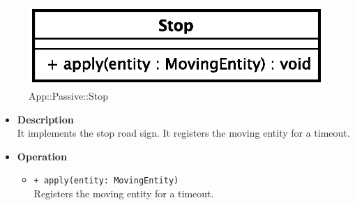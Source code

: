 \begin{figure}[h]
\centering
\includegraphics[scale=0.6,keepaspectratio]{images/solution/stop.eps}
\caption{App::Passive::Stop}
\label{fig:sd-app-stop}
\end{figure}
\FloatBarrier
\begin{itemize}
  \item \textbf{Description} \\
It implements the stop road sign. It registers the moving entity for a timeout.
  \item \textbf{Operation}
  \begin{itemize} 
  \item \texttt{+ apply(entity: MovingEntity)} \\
Registers the moving entity for a timeout.
  \end{itemize}
\end{itemize}
